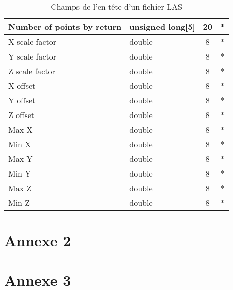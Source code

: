 \begin{table}[htpb!]
\begin{tabular}{|l|l|c|c|}
Number of points by return           & unsigned long{[}5{]}     & 20    & * \\ \hline
X scale factor                       & double                   & 8     & * \\ \hline
Y scale factor                       & double                   & 8     & * \\ \hline
Z scale factor                       & double                   & 8     & * \\ \hline
X offset                             & double                   & 8     & * \\ \hline
Y offset                             & double                   & 8     & * \\ \hline
Z offset                             & double                   & 8     & * \\ \hline
Max X                                & double                   & 8     & * \\ \hline
Min X                                & double                   & 8     & * \\ \hline
Max Y                                & double                   & 8     & * \\ \hline
Min Y                                & double                   & 8     & * \\ \hline
Max Z                                & double                   & 8     & * \\ \hline
Min Z                                & double                   & 8     & * \\ \hline
\end{tabular}
\caption[Champs de l'en-tête d'un fichier LAS]{Champs de l'en-tête d'un fichier LAS}
\label{tab:las_header}
\end{table}

\chapter*{Annexe 2}


\chapter*{Annexe 3}


\stopcontents[annexes]
\resumecontents[default]
